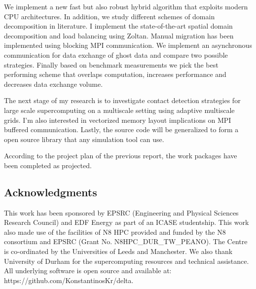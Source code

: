 \documentclass[times,12pt]{article}
\begin{document}
We implement a new fast but also robust hybrid algorithm that exploits modern CPU architectures. In addition, we study different schemes of domain decomposition in literature. I implement the state-of-the-art spatial domain decomposition and load balancing using Zoltan. Manual migration has been implemented using blocking MPI communication. We implement an asynchronous communication for data exchange of ghost data and compare two possible strategies. Finally based on benchmark measurements we pick the best performing scheme that overlaps computation, increases performance and decreases data exchange volume.

The next stage of my research is to investigate contact detection strategies for large scale supercomputing on a multiscale setting using adaptive multiscale grids. I'm also interested in vectorized memory layout implications on MPI buffered communication. Lastly, the source code will be generalized to form a open source library that any simulation tool can use. 

According to the project plan of the previous report, the work packages have been completed as projected.
 
\subsection{Acknowledgments}
This work has been sponsored by EPSRC (Engineering and Physical Sciences Research Council) and EDF Energy as part of an ICASE studentship. This work also made use of the facilities of N8 HPC provided and funded by the N8 consortium and EPSRC (Grant No. N8HPC{\_}DUR{\_}TW{\_}PEANO). The Centre is co-ordinated by the Universities of Leeds and Manchester. We also thank University of Durham for the supercomputing resources and technical assistance. All underlying software is open source and available at: https://github.com/KonstantinosKr/delta.

\clearpage
\nocite{*}
{}

\end{document}
